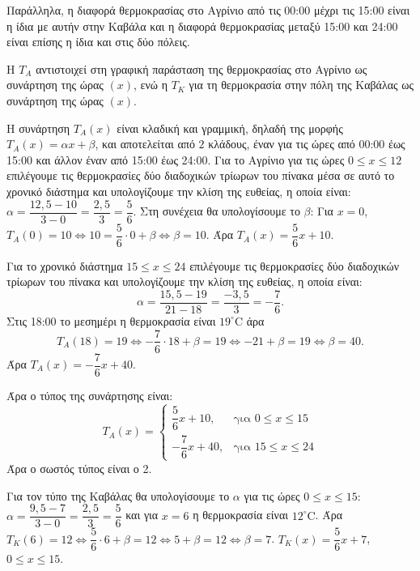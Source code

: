 \begin{alist}
Παράλληλα, η διαφορά θερμοκρασίας στο Αγρίνιο από τις 00:00 μέχρι τις 15:00 είναι η ίδια με αυτήν στην Καβάλα και η διαφορά θερμοκρασίας μεταξύ 15:00 και 24:00 είναι επίσης η ίδια και στις δύο πόλεις.

\item
\begin{rlist}
\item Η $T_A$ αντιστοιχεί στη γραφική παράσταση της θερμοκρασίας στο Αγρίνιο ως συνάρτηση της ώρας $(x)$, ενώ η $T_K$ για τη θερμοκρασία στην πόλη της Καβάλας ως συνάρτηση της ώρας $(x)$.

\item Η συνάρτηση $T_A(x)$ είναι κλαδική και γραμμική, δηλαδή της μορφής $T_A(x) = \alpha x + \beta$, και αποτελείται από $2$ κλάδους, έναν για τις ώρες από 00:00 έως 15:00 και άλλον έναν από 15:00 έως 24:00.
Για το Αγρίνιο για τις ώρες $0 \le x \le 12$ επιλέγουμε τις θερμοκρασίες δύο διαδοχικών τρίωρων του πίνακα μέσα σε αυτό το χρονικό διάστημα και υπολογίζουμε την κλίση της ευθείας, η οποία είναι: $\alpha = \dfrac{12,5 - 10}{3 - 0} = \dfrac{2,5}{3} = \dfrac{5}{6}$.
Στη συνέχεια θα υπολογίσουμε το $\beta$:
Για $x = 0$, $T_A(0) = 10 \Leftrightarrow 10 = \dfrac{5}{6} \cdot 0 + \beta \Leftrightarrow \beta = 10$.
Άρα $T_A(x) = \dfrac{5}{6}x + 10$.

Για το χρονικό διάστημα $15 \le x \le 24$ επιλέγουμε τις θερμοκρασίες δύο διαδοχικών τρίωρων του πίνακα και υπολογίζουμε την κλίση της ευθείας, η οποία είναι:
\[\alpha = \dfrac{15,5 - 19}{21 - 18} = \dfrac{-3,5}{3} = -\dfrac{7}{6}.\]
Στις 18:00 το μεσημέρι η θερμοκρασία είναι $19^\circ\text{C}$ άρα
\[T_A(18) = 19 \Leftrightarrow -\dfrac{7}{6} \cdot 18 + \beta = 19 \Leftrightarrow -21 + \beta = 19 \Leftrightarrow \beta = 40.\]
Άρα $T_A(x) = -\dfrac{7}{6}x + 40$.

Άρα ο τύπος της συνάρτησης είναι:
\[T_A(x) = \begin{cases} \dfrac{5}{6}x + 10, & \text{για } 0 \le x \le 15 \\[2ex] -\dfrac{7}{6}x + 40, & \text{για } 15 \le x \le 24 \end{cases}\]
Άρα ο σωστός τύπος είναι ο 2.

\item Για τον τύπο της Καβάλας θα υπολογίσουμε το $\alpha$ για τις ώρες $0 \le x \le 15$:
$\alpha = \dfrac{9,5 - 7}{3 - 0} = \dfrac{2,5}{3} = \dfrac{5}{6}$ και για $x = 6$ η θερμοκρασία είναι $12^\circ\text{C}$.
Άρα $T_K(6) = 12 \Leftrightarrow \dfrac{5}{6} \cdot 6 + \beta = 12 \Leftrightarrow 5 + \beta = 12 \Leftrightarrow \beta = 7$.
$T_K(x) = \dfrac{5}{6}x + 7$, $0 \le x \le 15$.


\end{rlist}
\end{alist}
